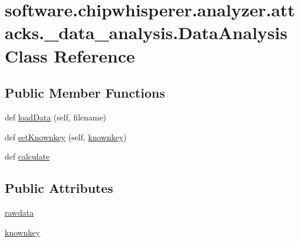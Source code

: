 \hypertarget{classsoftware_1_1chipwhisperer_1_1analyzer_1_1attacks_1_1__data__analysis_1_1DataAnalysis}{}\section{software.\+chipwhisperer.\+analyzer.\+attacks.\+\_\+data\+\_\+analysis.\+Data\+Analysis Class Reference}
\label{classsoftware_1_1chipwhisperer_1_1analyzer_1_1attacks_1_1__data__analysis_1_1DataAnalysis}
\subsection*{Public Member Functions}
\begin{DoxyCompactItemize}
\item 
def \hyperlink{classsoftware_1_1chipwhisperer_1_1analyzer_1_1attacks_1_1__data__analysis_1_1DataAnalysis_a96f376d2f17fcf633582980082bdee2c}{load\+Data} (self, filename)
\item 
def \hyperlink{classsoftware_1_1chipwhisperer_1_1analyzer_1_1attacks_1_1__data__analysis_1_1DataAnalysis_ae01a2f63cf38a43d91a50c73fdecdcb7}{set\+Knownkey} (self, \hyperlink{classsoftware_1_1chipwhisperer_1_1analyzer_1_1attacks_1_1__data__analysis_1_1DataAnalysis_a207516056735e3966c24a7eb2d2e836a}{knownkey})
\item 
def \hyperlink{classsoftware_1_1chipwhisperer_1_1analyzer_1_1attacks_1_1__data__analysis_1_1DataAnalysis_ab2c7d26838e31f8bf2d346c12ba0323f}{calculate}
\end{DoxyCompactItemize}
\subsection*{Public Attributes}
\begin{DoxyCompactItemize}
\item 
\hyperlink{classsoftware_1_1chipwhisperer_1_1analyzer_1_1attacks_1_1__data__analysis_1_1DataAnalysis_a6f5e5781d17b950cb00eb4ce0177a2b5}{rawdata}
\item 
\hyperlink{classsoftware_1_1chipwhisperer_1_1analyzer_1_1attacks_1_1__data__analysis_1_1DataAnalysis_a207516056735e3966c24a7eb2d2e836a}{knownkey}
\end{DoxyCompactItemize}


